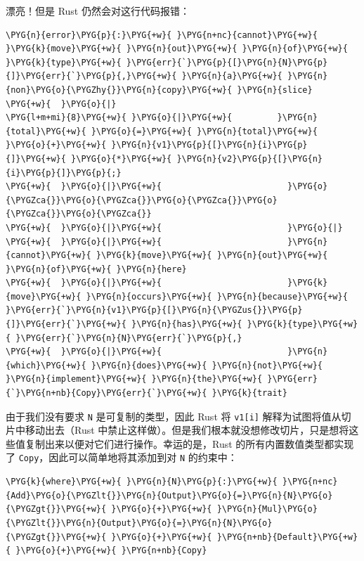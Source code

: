漂亮！但是 Rust 仍然会对这行代码报错：

\begin{Verbatim}[commandchars=\\\{\},breaklines=true,breakanywhere=true,fontsize=\codefont,xleftmargin=17bp]
\PYG{n}{error}\PYG{p}{:}\PYG{+w}{ }\PYG{n+nc}{cannot}\PYG{+w}{ }\PYG{k}{move}\PYG{+w}{ }\PYG{n}{out}\PYG{+w}{ }\PYG{n}{of}\PYG{+w}{ }\PYG{k}{type}\PYG{+w}{ }\PYG{err}{`}\PYG{p}{[}\PYG{n}{N}\PYG{p}{]}\PYG{err}{`}\PYG{p}{,}\PYG{+w}{ }\PYG{n}{a}\PYG{+w}{ }\PYG{n}{non}\PYG{o}{\PYGZhy{}}\PYG{n}{copy}\PYG{+w}{ }\PYG{n}{slice}
\PYG{+w}{  }\PYG{o}{|}
\PYG{l+m+mi}{8}\PYG{+w}{ }\PYG{o}{|}\PYG{+w}{         }\PYG{n}{total}\PYG{+w}{ }\PYG{o}{=}\PYG{+w}{ }\PYG{n}{total}\PYG{+w}{ }\PYG{o}{+}\PYG{+w}{ }\PYG{n}{v1}\PYG{p}{[}\PYG{n}{i}\PYG{p}{]}\PYG{+w}{ }\PYG{o}{*}\PYG{+w}{ }\PYG{n}{v2}\PYG{p}{[}\PYG{n}{i}\PYG{p}{]}\PYG{p}{;}
\PYG{+w}{  }\PYG{o}{|}\PYG{+w}{                         }\PYG{o}{\PYGZca{}}\PYG{o}{\PYGZca{}}\PYG{o}{\PYGZca{}}\PYG{o}{\PYGZca{}}\PYG{o}{\PYGZca{}}
\PYG{+w}{  }\PYG{o}{|}\PYG{+w}{                         }\PYG{o}{|}
\PYG{+w}{  }\PYG{o}{|}\PYG{+w}{                         }\PYG{n}{cannot}\PYG{+w}{ }\PYG{k}{move}\PYG{+w}{ }\PYG{n}{out}\PYG{+w}{ }\PYG{n}{of}\PYG{+w}{ }\PYG{n}{here}
\PYG{+w}{  }\PYG{o}{|}\PYG{+w}{                         }\PYG{k}{move}\PYG{+w}{ }\PYG{n}{occurs}\PYG{+w}{ }\PYG{n}{because}\PYG{+w}{ }\PYG{err}{`}\PYG{n}{v1}\PYG{p}{[}\PYG{n}{\PYGZus{}}\PYG{p}{]}\PYG{err}{`}\PYG{+w}{ }\PYG{n}{has}\PYG{+w}{ }\PYG{k}{type}\PYG{+w}{ }\PYG{err}{`}\PYG{n}{N}\PYG{err}{`}\PYG{p}{,}
\PYG{+w}{  }\PYG{o}{|}\PYG{+w}{                         }\PYG{n}{which}\PYG{+w}{ }\PYG{n}{does}\PYG{+w}{ }\PYG{n}{not}\PYG{+w}{ }\PYG{n}{implement}\PYG{+w}{ }\PYG{n}{the}\PYG{+w}{ }\PYG{err}{`}\PYG{n+nb}{Copy}\PYG{err}{`}\PYG{+w}{ }\PYG{k}{trait}
\end{Verbatim}

由于我们没有要求 \texttt{N} 是可复制的类型，因此 Rust 将 \texttt{v1[i]} 解释为试图将值从切片中移动出去（Rust 中禁止这样做）。但是我们根本就没想修改切片，只是想将这些值复制出来以便对它们进行操作。幸运的是，Rust 的所有内置数值类型都实现了 \texttt{Copy}，因此可以简单地将其添加到对 \texttt{N} 的约束中：

\begin{Verbatim}[commandchars=\\\{\},breaklines=true,breakanywhere=true,fontsize=\codefont,xleftmargin=17bp]
\PYG{k}{where}\PYG{+w}{ }\PYG{n}{N}\PYG{p}{:}\PYG{+w}{ }\PYG{n+nc}{Add}\PYG{o}{\PYGZlt{}}\PYG{n}{Output}\PYG{o}{=}\PYG{n}{N}\PYG{o}{\PYGZgt{}}\PYG{+w}{ }\PYG{o}{+}\PYG{+w}{ }\PYG{n}{Mul}\PYG{o}{\PYGZlt{}}\PYG{n}{Output}\PYG{o}{=}\PYG{n}{N}\PYG{o}{\PYGZgt{}}\PYG{+w}{ }\PYG{o}{+}\PYG{+w}{ }\PYG{n+nb}{Default}\PYG{+w}{ }\PYG{o}{+}\PYG{+w}{ }\PYG{n+nb}{Copy}
\end{Verbatim}

